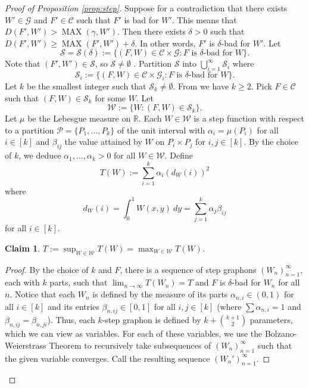 \documentclass[11pt]{article}
\newtheorem{claim}[thm]{Claim}
\theoremstyle{definition}
\newcommand{\R}{\mathbb{R}}
\newcommand{\C}{\mathscr{C}}
\begin{document}
\begin{proof}[Proof of Proposition \ref{prop:step}]
    Suppose for a  contradiction that there exists  $W' \in \mathcal G$ and  $F' \in \C$ such that $F'$  is bad for $W'$. This means that $D(F', W') >\operatorname{MAX}(\gamma, W')$. Then there exists $\delta > 0$ such that $D(F', W') \ge \operatorname{MAX}(F', W')+\delta$. In other words, $F'$ is $\delta$-bad for $W'$. Let \[ \mathcal{S} = \mathcal{S}(\delta) := \{ (F,W)  \in \C \times \mathcal{G}: \text{$F$ is $\delta$-bad for }  W \}. \] Note that $(F', W') \in \mathcal{S}$, so $\mathcal{S}\ne \emptyset$ . Partition $\mathcal{S}$ into $\bigcup_{i=1}^\infty \mathcal{S}_i$ where \[ \mathcal{S}_i := \{(F,W)\in \C \times \mathcal {G}_i :\text{$F$ is $\delta$-bad for $W$}\}. \] Let $k$ be the smallest integer such that $\mathcal{S}_k \ne \emptyset$. From \cite[Observation 2.1]{RW} we have $k \ge 2$. Pick $F \in \C$ such that $(F,W) \in \mathcal{S}_k$ for some $W$. Let \[ \mathcal{W} := \{ W : (F, W) \in \mathcal{S}_k \}. \] Let $\mu$ be the Lebesgue measure on $\R$. Each $W \in \mathcal{W}$ is a step function with respect to a partition $\mathcal{P} = \{ P_1, \ldots, P_k \}$ of the unit interval with $\alpha_i = \mu (P_i)$ for all $i \in [k]$ and $\beta_{ij}$ the value attained by $W$ on $P_i \times P_j$ for $i,j \in [k]$. By the choice of $k$, we deduce $\alpha_1, \ldots, \alpha_k >0$ for all $W \in \mathcal{W}$. Define \[ T(W) := \sum_{i = 1}^k \alpha_i (d_W (i))^2 \] where \[ d_W (i) = \int_0^1 W(x,y) ~dy = \sum_{j = 1}^k \alpha_j \beta_{ij} \] for all $i \in [k]$. 
  
    \begin{claim}\label{claim:T}
        $T := \sup_{W \in \mathcal{W}} T(W) = \max_{W \in \mathcal{W}} T(W)$.
    \end{claim}
    
    \begin{proof}
        By the choice of $k$ and $F$, there is a sequence of  step graphons $(W_n)_{n = 1}^\infty$, each with $k$ parts, such that $\lim_{n \to \infty} T (W_n) = T$ and $F$ is $\delta$-bad for $W_n$ for all $n$. Notice that each $W_n$ is defined by the measure of its parts $\alpha_{n,i} \in (0,1)$ for all $i \in [k]$ and its entries $\beta_{n,ij} \in [0,1]$ for all $i,j \in [k]$ (where $\sum \alpha_{n,i} = 1$ and $\beta_{n,ij} = \beta_{n,ji}$). Thus, each $k$-step graphon is defined by $k + \binom{k+1}{2}$ parameters, which we can view as variables. For each of these variables, we use the Bolzano-Weierstrass Theorem to recursively take subsequences of $(W_n)_{n = 1}^\infty$ such that the given variable converges. Call the resulting sequence $(W_n')_{n = 1}^\infty$.
        

\end{proof}
\end{proof}
\end{document}
